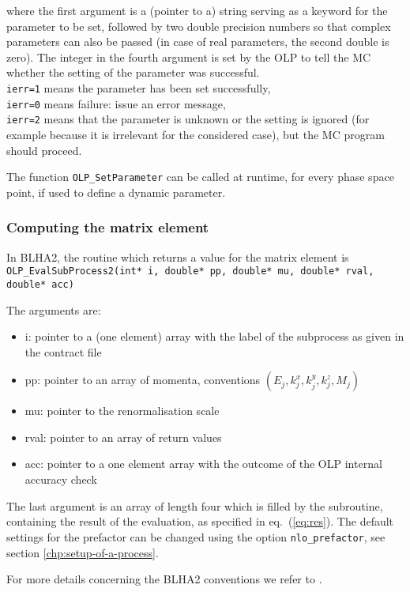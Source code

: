 where the first argument is a (pointer to a) string serving as a keyword 
for the parameter to be set, followed by two double precision numbers
so that complex parameters can also be passed (in case of real parameters, 
the second double is zero). The integer in the fourth argument 
is set by the OLP to tell the MC whether the setting of the parameter 
was successful.\\
{\tt ierr=1} means the parameter has been set successfully, \\
{\tt ierr=0} means failure: issue an error message, \\
{\tt ierr=2} means that the parameter is unknown 
or the setting is ignored (for example because it is irrelevant 
for the considered case), but the MC program should proceed.


The function {\tt OLP\_SetParameter} can be called at runtime, 
for every phase space point, 
if used to define a dynamic parameter. 

\subsubsection{Computing the matrix element}

In BLHA2, the routine which returns a value for the matrix element is\\
{\small {\tt OLP\_EvalSubProcess2(int* i, double* pp, double* mu, double* rval, double* acc)}}


The arguments are:
\begin{itemize}
\item i: pointer to a (one element) array with the label of the subprocess as given in the contract file
\item pp: pointer to an array of momenta, conventions $(E_j,k_j^x,k_j^y,k_j^z,M_j)$
\item mu: pointer to the renormalisation scale 
\item rval: pointer to an array of return values
\item acc: pointer to a one element array with the outcome of the 
OLP internal accuracy check 
\end{itemize}


The last argument is an array of length four which is filled by the subroutine, 
containing the result of the evaluation, as specified in eq.~(\ref{eq:res}).
The default settings for the prefactor can be changed using the option {\tt nlo\_prefactor}, 
see section \ref{chp:setup-of-a-process}.

For more details concerning the BLHA2 conventions we refer to \cite{Alioli:2013nda}.


